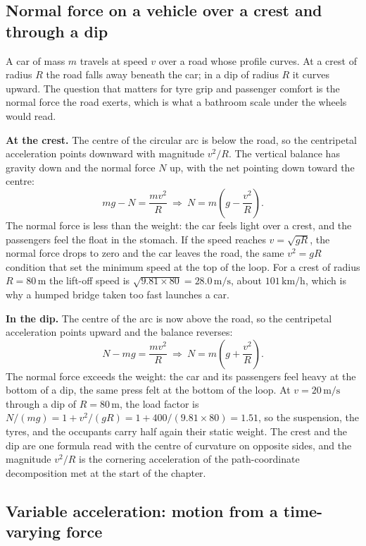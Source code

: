 \subsection{Normal force on a vehicle over a crest and through a dip}

A car of mass $m$ travels at speed $v$ over a road whose profile curves.
At a crest of radius $R$ the road falls away beneath the car; in a dip
of radius $R$ it curves upward. The question that matters for tyre grip
and passenger comfort is the normal force the road exerts, which is what
a bathroom scale under the wheels would read.

\textbf{At the crest.} The centre of the circular arc is below the road,
so the centripetal acceleration points downward with magnitude
$v^{2}/R$. The vertical balance has gravity down and the normal force
$N$ up, with the net pointing down toward the centre:
\[
mg-N=\frac{mv^{2}}{R}
\ \Rightarrow\
N=m\!\left(g-\frac{v^{2}}{R}\right).
\]
The normal force is less than the weight: the car feels light over a
crest, and the passengers feel the float in the stomach. If the speed
reaches $v=\sqrt{gR}$, the normal force drops to zero and the car
leaves the road, the same $v^{2}=gR$ condition that set the minimum
speed at the top of the loop. For a crest of radius $R=80\,\si{\meter}$
the lift-off speed is $\sqrt{9.81\times 80}=28.0\,\si{\meter\per\second}$,
about $101\,\si{\kilo\meter\per\hour}$, which is why a humped bridge
taken too fast launches a car.

\textbf{In the dip.} The centre of the arc is now above the road, so
the centripetal acceleration points upward and the balance reverses:
\[
N-mg=\frac{mv^{2}}{R}
\ \Rightarrow\
N=m\!\left(g+\frac{v^{2}}{R}\right).
\]
The normal force exceeds the weight: the car and its passengers feel
heavy at the bottom of a dip, the same press felt at the bottom of the
loop. At $v=20\,\si{\meter\per\second}$ through a dip of $R=80\,\si{
\meter}$, the load factor is $N/(mg)=1+v^{2}/(gR)=1+400/(9.81\times 80)
=1.51$, so the suspension, the tyres, and the occupants carry half
again their static weight. The crest and the dip are one formula read
with the centre of curvature on opposite sides, and the magnitude
$v^{2}/R$ is the cornering acceleration of the path-coordinate
decomposition met at the start of the chapter.

\subsection{Variable acceleration: motion from a time-varying force}

